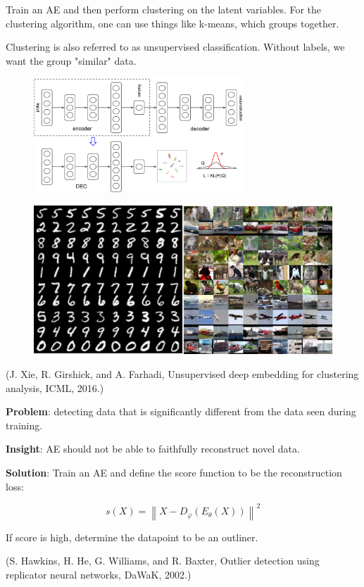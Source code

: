 \documentclass{report}
\begin{document}
\begin{concept}[9.6][Applications of AE]
    Train an AE and then perform clustering on the latent variables. For the clustering algorithm, one can use things like k-means, which groups together.

    Clustering is also referred to as unsupervised classification. Without labels, we want the group "similar" data.

    \begin{figure}[H]
        \centering
        \includegraphics[width=0.7\textwidth]{.././assets/9.4.png}
    \end{figure}

    \begin{figure}[H]
        \centering
        \includegraphics[width=1.0\textwidth]{.././assets/9.5.png}
    \end{figure}

    (J. Xie, R. Girshick, and A. Farhadi, Unsupervised deep embedding for clustering analysis, ICML, 2016.)
\end{concept}

\begin{concept}
    \textbf{Problem}: detecting data that is significantly different from the data seen during training.

    \textbf{Insight}: AE should not be able to faithfully reconstruct novel data.

    \textbf{Solution}: Train an AE and define the score function to be the reconstruction loss:

    $$
    s(X)=\left\|X-D_{\varphi}\left(E_{\theta}(X)\right)\right\|^{2}
    $$

    If score is high, determine the datapoint to be an outliner.

    (S. Hawkins, H. He, G. Williams, and R. Baxter, Outlier detection using replicator neural networks, DaWaK, 2002.)
\end{concept}
\end{document}
